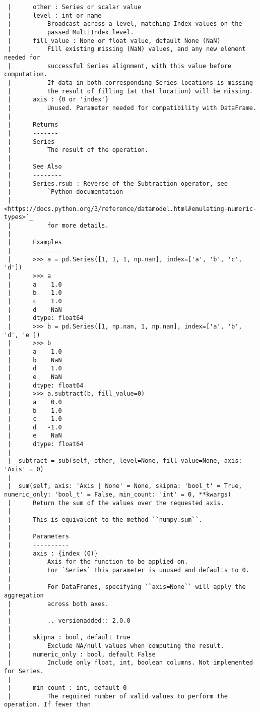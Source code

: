 \documentclass[
  letterpaper,
  DIV=11,
  numbers=noendperiod]{scrreprt}
\begin{document}
\begin{verbatim}
 |      other : Series or scalar value
 |      level : int or name
 |          Broadcast across a level, matching Index values on the
 |          passed MultiIndex level.
 |      fill_value : None or float value, default None (NaN)
 |          Fill existing missing (NaN) values, and any new element needed for
 |          successful Series alignment, with this value before computation.
 |          If data in both corresponding Series locations is missing
 |          the result of filling (at that location) will be missing.
 |      axis : {0 or 'index'}
 |          Unused. Parameter needed for compatibility with DataFrame.
 |      
 |      Returns
 |      -------
 |      Series
 |          The result of the operation.
 |      
 |      See Also
 |      --------
 |      Series.rsub : Reverse of the Subtraction operator, see
 |          `Python documentation
 |          <https://docs.python.org/3/reference/datamodel.html#emulating-numeric-types>`_
 |          for more details.
 |      
 |      Examples
 |      --------
 |      >>> a = pd.Series([1, 1, 1, np.nan], index=['a', 'b', 'c', 'd'])
 |      >>> a
 |      a    1.0
 |      b    1.0
 |      c    1.0
 |      d    NaN
 |      dtype: float64
 |      >>> b = pd.Series([1, np.nan, 1, np.nan], index=['a', 'b', 'd', 'e'])
 |      >>> b
 |      a    1.0
 |      b    NaN
 |      d    1.0
 |      e    NaN
 |      dtype: float64
 |      >>> a.subtract(b, fill_value=0)
 |      a    0.0
 |      b    1.0
 |      c    1.0
 |      d   -1.0
 |      e    NaN
 |      dtype: float64
 |  
 |  subtract = sub(self, other, level=None, fill_value=None, axis: 'Axis' = 0)
 |  
 |  sum(self, axis: 'Axis | None' = None, skipna: 'bool_t' = True, numeric_only: 'bool_t' = False, min_count: 'int' = 0, **kwargs)
 |      Return the sum of the values over the requested axis.
 |      
 |      This is equivalent to the method ``numpy.sum``.
 |      
 |      Parameters
 |      ----------
 |      axis : {index (0)}
 |          Axis for the function to be applied on.
 |          For `Series` this parameter is unused and defaults to 0.
 |      
 |          For DataFrames, specifying ``axis=None`` will apply the aggregation
 |          across both axes.
 |      
 |          .. versionadded:: 2.0.0
 |      
 |      skipna : bool, default True
 |          Exclude NA/null values when computing the result.
 |      numeric_only : bool, default False
 |          Include only float, int, boolean columns. Not implemented for Series.
 |      
 |      min_count : int, default 0
 |          The required number of valid values to perform the operation. If fewer than

\end{verbatim}
\end{document}
